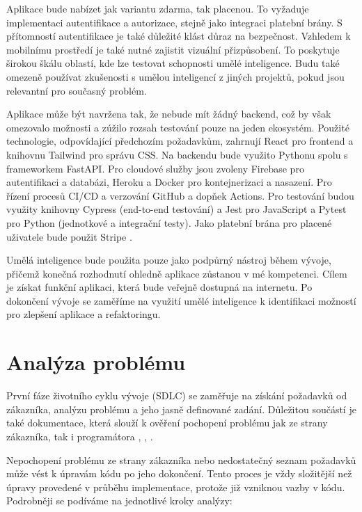 \documentclass[FM,DP]{tulthesis}
\begin{document}
		Aplikace bude nabízet jak variantu zdarma, tak placenou. To vyžaduje implementaci autentifikace a autorizace, stejně jako integraci platební brány. S přítomností autentifikace je také důležité klást důraz na bezpečnost. Vzhledem k mobilnímu prostředí je také nutné zajistit vizuální přizpůsobení. To poskytuje širokou škálu oblastí, kde lze testovat schopnosti umělé inteligence. Budu také omezeně používat zkušenosti s umělou inteligencí z jiných projektů, pokud jsou relevantní pro současný problém.
		
		Aplikace může být navržena tak, že nebude mít žádný backend, což by však omezovalo možnosti a zúžilo rozsah testování pouze na jeden ekosystém. Použité technologie, odpovídající předchozím požadavkům, zahrnují React pro frontend a knihovnu Tailwind pro správu CSS. Na backendu bude využito Pythonu spolu s frameworkem FastAPI. Pro cloudové služby jsou zvoleny Firebase pro autentifikaci a databázi, Heroku a Docker pro kontejnerizaci a nasazení. Pro řízení procesů CI/CD a verzování GitHub a dopňek Actions. Pro testování budou využity knihovny Cypress (end-to-end testování) a Jest pro JavaScript a Pytest pro Python (jednotkové a integrační testy). Jako platební brána pro placené uživatele bude použit Stripe \cite{fastapi} \cite{docker} \cite{react} \cite{heroku}.
		
		Umělá inteligence bude použita pouze jako podpůrný nástroj během vývoje, přičemž konečná rozhodnutí ohledně aplikace zůstanou v mé kompetenci. Cílem je získat funkční aplikaci, která bude veřejně dostupná na internetu. Po dokončení vývoje se zaměříme na využití umělé inteligence k identifikaci možností pro zlepšení aplikace a refaktoringu.
		
		\section{Analýza problému}
		První fáze životního cyklu vývoje (SDLC) se zaměřuje na získání požadavků od zákazníka, analýzu problému a jeho jasně definované zadání. Důležitou součástí je také dokumentace, která slouží k ověření pochopení problému jak ze strany zákazníka, tak i programátora \cite{problem_analysis3}, \cite{software_analysis}, \cite{SWEBook}.
		
		Nepochopení problému ze strany zákazníka nebo nedostatečný seznam požadavků může vést k úpravám kódu po jeho dokončení. Tento proces je vždy složitější než úpravy provedené v průběhu implementace, protože již vzniknou vazby v kódu. Podrobněji se podíváme na jednotlivé kroky analýzy:
		
\end{document}
